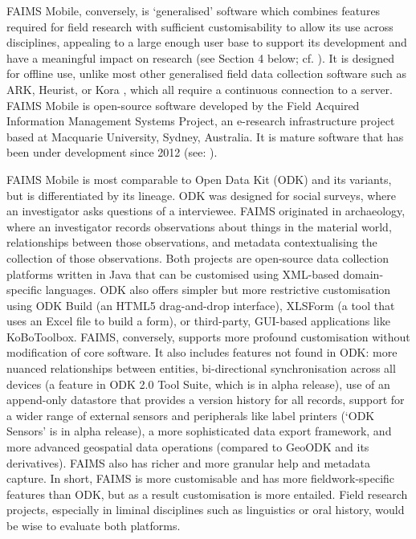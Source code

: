 \documentclass[preprint,12pt, a4paper]{elsarticle}
\begin{document}
FAIMS Mobile, conversely, is `generalised' software which combines features required for field research with sufficient customisability to allow its use across disciplines, appealing to a large enough user base to support its development and have a meaningful impact on research (see Section 4 below; cf. \cite{Sobotkova2016-mx}). It is designed for offline use, unlike most other generalised field data collection software such as ARK, Heurist, or Kora \cite{Gordon2016-xf}, which all require a continuous connection to a server. FAIMS Mobile is open-source software developed by the Field Acquired Information Management Systems Project, an e-research infrastructure project based at Macquarie University, Sydney, Australia. It is mature software that has been under development since 2012 (see: \cite{Ross2015-mo, Ross2013-dz, Sobotkova2015-lq}). 

FAIMS Mobile is most comparable to Open Data Kit (ODK) \cite{University_of_Washington2010-cl} and its variants, but is differentiated by its lineage. ODK was designed for social surveys, where an investigator asks questions of a interviewee. FAIMS originated in archaeology, where an investigator records observations about things in the material world, relationships between those observations, and metadata contextualising the collection of those observations. Both projects are open-source data collection platforms written in Java that can be customised using XML-based domain-specific languages. ODK also offers simpler but more restrictive customisation using ODK Build (an HTML5 drag-and-drop interface), XLSForm (a tool that uses an Excel file to build a form), or third-party, GUI-based applications like KoBoToolbox. FAIMS, conversely, supports more profound customisation without modification of core software. It also includes features not found in ODK: more nuanced relationships between entities, bi-directional synchronisation across all devices (a feature in ODK 2.0 Tool Suite, which is in alpha release), use of an append-only datastore that provides a version history for all records, support for a wider range of external sensors and peripherals like label printers (`ODK Sensors' is in alpha release), a more sophisticated data export framework, and more advanced geospatial data operations (compared to GeoODK and its derivatives). FAIMS also has richer and more granular help and metadata capture. In short, FAIMS is more customisable and has more fieldwork-specific features than ODK, but as a result customisation is more entailed. Field research projects, especially in liminal disciplines such as linguistics or oral history, would be wise to evaluate both platforms.
\end{document}
